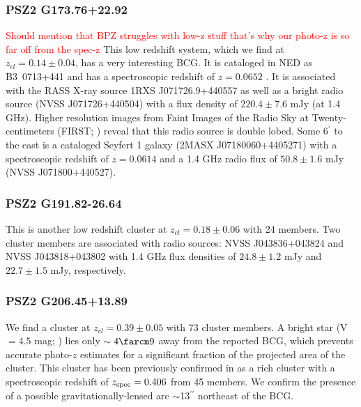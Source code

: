 \documentclass[apj, revtex4-1]{emulateapj}
\newcommand{\editorial}[1]{\textcolor{red}{#1}}
\begin{document}
\subsubsection{PSZ2 G173.76+22.92} %
\editorial{Should mention that BPZ struggles with low-z stuff that's why our photo-z is so far off from the spec-z}
This low redshift system, which we find at $z_{cl} = 0.14 \pm 0.04$, has a very interesting BCG. It is cataloged in NED as B3~0713+441 and has a spectroscopic redshift of $z=0.0652$ \citep{Bauer2000}. It is associated with the RASS X-ray source 1RXS J071726.9+440557 as well as a bright radio source (NVSS J071726+440504) with a flux density of $220.4\pm 7.6$ mJy (at 1.4 GHz). Higher resolution images from Faint Images of the Radio Sky at Twenty-centimeters (FIRST; \citealt{Becker1995}) reveal that this radio source is double lobed. Some 6$^\prime$ to the east is a cataloged Seyfert 1 galaxy (2MASX J07180060+4405271) with a spectroscopic redshift of $z=0.0614$ \citep{Michel1988} and a 1.4 GHz radio flux of $50.8 \pm 1.6 $ mJy (NVSS J071800+440527).


\subsubsection{PSZ2 G191.82-26.64} %
This is another low redshift cluster at $z_{cl} = 0.18 \pm 0.06$ with 24 members. Two cluster members are associated with radio sources: NVSS J043836+043824 and NVSS J043818+043802 with 1.4 GHz flux densities of $24.8 \pm 1.2$ mJy and $22.7 \pm 1.5$ mJy, respectively.

\subsubsection{PSZ2 G206.45+13.89} %
We find a cluster at $z_{cl} = 0.39 \pm 0.05$ with 73 cluster members. A bright star (V $= 4.5$ mag; \citealt{Hog2000}) lies only $\sim4\farcm9$ away from the reported BCG, which prevents accurate photo-$z$ estimates for a significant fraction of the projected area of the cluster. This cluster has been previously confirmed in \citet{Barrena2018} as a rich cluster with a spectroscopic redshift of $z_{\rm spec} = 0.406$ from 45 members. We confirm the presence of a possible gravitationally-lensed arc $\sim$13$^{\prime\prime}$ northeast of the BCG.
\end{document}
